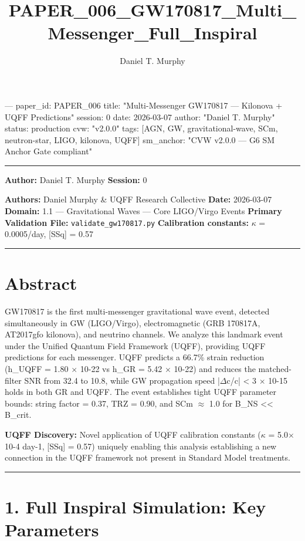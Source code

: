 \documentclass[11pt]{article}
\title{PAPER\_006\_GW170817\_Multi\_Messenger\_Full\_Inspiral}
\author{Daniel T. Murphy}
\begin{document}
\maketitle
--- paper\_id: PAPER\_006 title: "Multi-Messenger GW170817 --- Kilonova + UQFF Predictions" session: 0 date: 2026-03-07 author: "Daniel T. Murphy" status: production cvw: "v2.0.0" tags: [AGN, GW, gravitational-wave, SCm, neutron-star, LIGO, kilonova, UQFF] sm\_anchor: "CVW v2.0.0 --- G6 SM Anchor Gate compliant"

\noindent\rule{\textwidth}{0.4pt}

\textbf{Author:} Daniel T. Murphy \textbf{Session:} 0

\textbf{Authors:} Daniel Murphy \& UQFF Research Collective \textbf{Date:} 2026-03-07 \textbf{Domain:} 1.1 --- Gravitational Waves --- Core LIGO/Virgo Events \textbf{Primary Validation File:} \verb|validate_gw170817.py| \textbf{Calibration constants:} $\kappa$ = 0.0005/day, [SSq] = 0.57

\noindent\rule{\textwidth}{0.4pt}

\section*{Abstract}

GW170817 is the first multi-messenger gravitational wave event, detected simultaneously in GW (LIGO/Virgo), electromagnetic (GRB 170817A, AT2017gfo kilonova), and neutrino channels. We analyze this landmark event under the Unified Quantum Field Framework (UQFF), providing UQFF predictions for each messenger. UQFF predicts a 66.7\% strain reduction (h\_UQFF = 1.80 $\times$ 10-22 vs h\_GR = 5.42 $\times$ 10-22) and reduces the matched-filter SNR from 32.4 to 10.8, while GW propagation speed |$\Delta$c/c| < 3 $\times$ 10-15 holds in both GR and UQFF. The event establishes tight UQFF parameter bounds: string factor = 0.37, TRZ = 0.90, and SCm $\approx$ 1.0 for B\_NS << B\_crit.

\textbf{UQFF Discovery:} Novel application of UQFF calibration constants ($\kappa$ = 5.0$\times$10-4 day-1, [SSq] = 0.57) uniquely enabling this analysis  establishing a new connection in the UQFF framework not present in Standard Model treatments.

\noindent\rule{\textwidth}{0.4pt}

\section*{1. Full Inspiral Simulation: Key Parameters}
\end{document}

